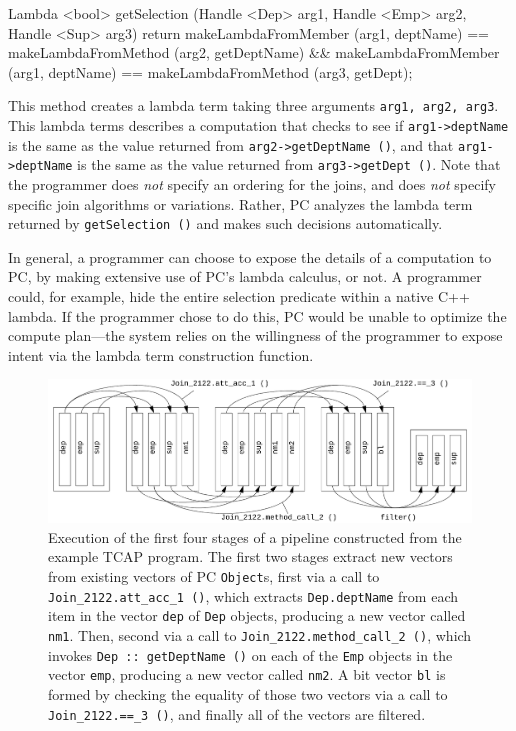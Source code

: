 \begin{codesmall} 
Lambda <bool> getSelection (Handle <Dep> arg1, Handle <Emp> arg2, Handle <Sup> arg3) {
	return makeLambdaFromMember (arg1, deptName) == 
	       makeLambdaFromMethod (arg2, getDeptName) &&
	       makeLambdaFromMember (arg1, deptName) == 
               makeLambdaFromMethod (arg3, getDept);   }
\end{codesmall}

\noindent
This method creates a lambda term taking three arguments \texttt{arg1, arg2, arg3}.  This lambda terms describes a computation that
checks to see if \texttt{arg1->deptName} is the same as the value returned from \texttt{arg2->getDeptName ()}, and
that \texttt{arg1->deptName} is the same as the value returned from \texttt{arg3}\-\texttt{->getDept ()}. 
Note that the programmer does \emph{not} specify an ordering for the joins, and does \emph{not} specify specific join algorithms or variations.  Rather, PC
analyzes the lambda term returned by \texttt{getSelection ()} and
makes such decisions automatically.

In general, a programmer can choose to expose the details of a computation to PC, by making extensive use of PC's lambda
calculus, or not.  A programmer could, for example, hide the entire selection predicate within a native C++ lambda.
If the programmer chose to do this, PC would be unable to optimize the compute plan---the system relies on the willingness of the 
programmer to expose intent via the lambda term construction function.

\begin{figure}[t]
  \begin{center}
    \includegraphics[width=6in]{TCAP}
  \end{center}
\vspace{-10 pt}
  \caption{Execution of the first four stages of a pipeline constructed from the example TCAP program.  The first two stages extract new vectors from 
existing vectors of PC \texttt{Object}s, first via a call to \texttt{Join\_2122.att\_acc\_1 ()}, which extracts \texttt{Dep.deptName} from each item in the vector
\texttt{dep} 
of \texttt{Dep} objects, producing a new vector called \texttt{nm1}. Then, second
via a call to \texttt{Join\_2122.method\_call\_2 ()}, which invokes \texttt{Dep :: getDeptName ()} on each of the \texttt{Emp} objects
in the vector \texttt{emp}, producing a new vector called \texttt{nm2}.  A bit vector \texttt{bl} is formed by checking the equality of those two 
vectors via a call to \texttt{Join\_2122.==\_3 ()}, and finally all of the vectors are filtered.}
\vspace{-15 pt}
  \label{fig:TCAP}
\end{figure}


